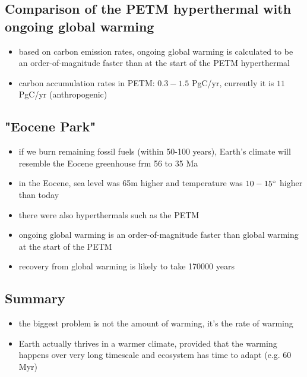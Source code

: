 \subsection{Comparison of the PETM hyperthermal with ongoing global warming}
\begin{itemize}
	\item based on carbon emission rates, ongoing global warming is
	calculated to be an order-of-magnitude faster than at the start of the
	PETM hyperthermal
	\item carbon accumulation rates in PETM: $0.3-1.5$ PgC/yr, currently it
	is $11$ PgC/yr (anthropogenic)
\end{itemize}

\subsection{"Eocene Park"}

\begin{itemize}
	\item if we burn remaining fossil fuels (within 50-100 years), Earth's
	climate will resemble the Eocene greenhouse frm 56 to 35 Ma
	\item in the Eocene, sea level was 65m higher and temperature was
	$10-15 \degree$ higher than today
	\item there were also hyperthermals such as the PETM
	\item ongoing global warming is an order-of-magnitude faster than
	global warming at the start of the PETM
	\item recovery from global warming is likely to take 170000 years
\end{itemize}

\subsection{Summary}
\begin{itemize}
	\item the biggest problem is not the amount of warming, it's the rate
	of warming
	\item Earth actually thrives in a warmer climate, provided that the
	warming happens over very long timescale and ecosystem has time to
	adapt (e.g. 60 Myr)
\end{itemize}
